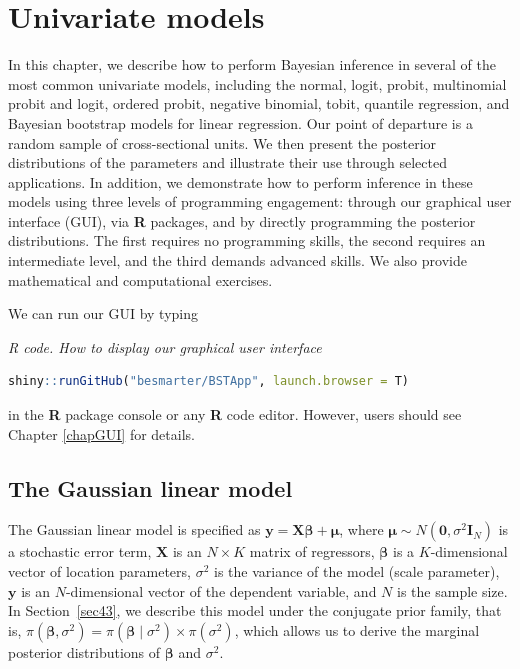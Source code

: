 \chapter{Univariate models}\label{chap6}

In this chapter, we describe how to perform Bayesian inference in several of the most common univariate models, including the normal, logit, probit, multinomial probit and logit, ordered probit, negative binomial, tobit, quantile regression, and Bayesian bootstrap models for linear regression. Our point of departure is a random sample of cross-sectional units. We then present the posterior distributions of the parameters and illustrate their use through selected applications. In addition, we demonstrate how to perform inference in these models using three levels of programming engagement: through our graphical user interface (GUI), via \textbf{R} packages, and by directly programming the posterior distributions. The first requires no programming skills, the second requires an intermediate level, and the third demands advanced skills. We also provide mathematical and computational exercises.


We can run our GUI by typing

\begin{tcolorbox}[enhanced,width=4.67in,center upper,
	fontupper=\large\bfseries,drop shadow southwest,sharp corners]
	\textit{R code. How to display our graphical user interface}
	\begin{VF}
		\begin{lstlisting}[language=R]
	shiny::runGitHub("besmarter/BSTApp", launch.browser = T)
\end{lstlisting}
	\end{VF}
\end{tcolorbox} 

in the \textbf{R} package console or any \textbf{R} code editor. However, users should see Chapter \ref{chapGUI} for details.

\section{The Gaussian linear model}\label{sec61}

The Gaussian linear model is specified as ${\bm{y}} = {\bm{X}}\bm{\beta} + \bm{\mu}$, where $\bm{\mu} \sim N(\bm{0}, \sigma^2 \bm{I}_N)$ is a stochastic error term, ${\bm{X}}$ is an $N \times K$ matrix of regressors, $\bm{\beta}$ is a $K$-dimensional vector of location parameters, $\sigma^2$ is the variance of the model (scale parameter), ${\bm{y}}$ is an $N$-dimensional vector of the dependent variable, and $N$ is the sample size. In Section~\ref{sec43}, we describe this model under the conjugate prior family, that is, $\pi(\bm{\beta}, \sigma^2) = \pi(\bm{\beta} \mid \sigma^2) \times \pi(\sigma^2)$, which allows us to derive the marginal posterior distributions of $\bm{\beta}$ and $\sigma^2$.

